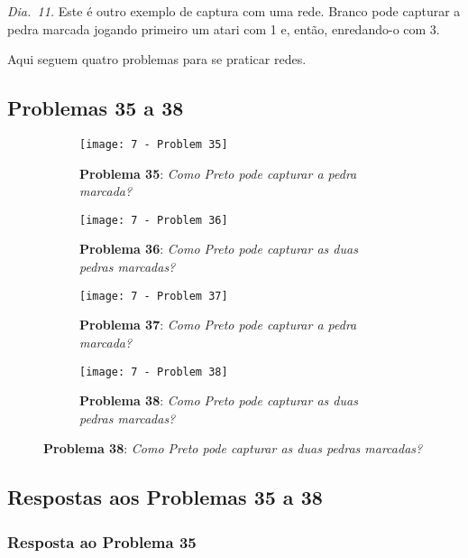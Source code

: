 \emph{Dia.\@~11.} Este é outro exemplo de captura com uma rede. Branco pode capturar a pedra marcada jogando primeiro um atari com 1 e, então, enredando-o com 3.

Aqui seguem quatro problemas para se praticar redes.

\pagebreak

\subsection{Problemas 35 a 38}

\begin{figure}[h!]
    \centering
    \begin{subfigure}[t]{.35\textwidth}
        \texttt{[image: 7 - Problem 35]}
        \caption*{\textbf{Problema 35}: \emph{Como Preto pode capturar a pedra marcada?}}
    \end{subfigure}
    \hspace{1.5cm}
    \begin{subfigure}[t]{.35\textwidth}
        \texttt{[image: 7 - Problem 36]}
        \caption*{\textbf{Problema 36}: \emph{Como Preto pode capturar as duas pedras marcadas?}}
    \end{subfigure}
    \par\bigskip
    \begin{subfigure}[t]{.35\textwidth}
        \texttt{[image: 7 - Problem 37]}
        \caption*{\textbf{Problema 37}: \emph{Como Preto pode capturar a pedra marcada?}}
    \end{subfigure}
    \hspace{1.5cm}
    \begin{subfigure}[t]{.35\textwidth}
        \texttt{[image: 7 - Problem 38]}
        \caption*{\textbf{Problema 38}: \emph{Como Preto pode capturar as duas pedras marcadas?}}
    \end{subfigure}
\end{figure}

\pagebreak

\subsection{Respostas aos Problemas 35 a 38}

\subsubsection*{Resposta ao Problema 35}

